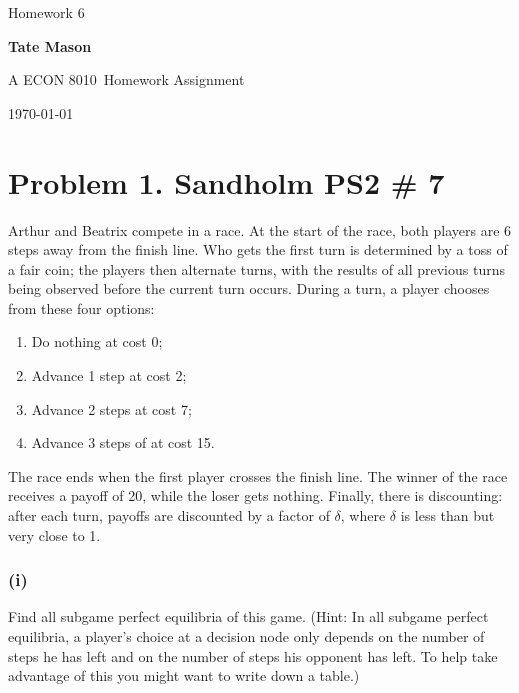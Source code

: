 \documentclass[10pt, a4paper]{article}
\newcommand\course{ECON 8010}                            %
\newcommand\hwnumber{6}                                  %
\newcommand\Information{Tate Mason}                        %
\begin{document}
  \begin{titlepage}
    \begin{center}
      \vspace*{3cm}
            
        \vspace{1cm}
        \huge
        Homework \hwnumber
            
        \vspace{1.5cm}
        \Large
            
        \textbf{\Information}                      %
            
        \vfill
        
        A \course \ Homework Assignment
            
        \vspace{1cm}
        \Large

        
        \today
            
    \end{center}
  \end{titlepage}

  \newpage
\section*{Problem 1. Sandholm PS2 \# 7}
  Arthur and Beatrix compete in a race. At the start of the race, both players are 6 steps away from the finish line. Who gets the first turn is determined by a toss of a fair coin; the players then alternate turns, with the results of all previous turns being observed before the current turn occurs.
  During a turn, a player chooses from these four options:
  \begin{enumerate}
    \item Do nothing at cost 0;
    \item Advance 1 step at cost 2;
    \item Advance 2 steps at cost 7;
    \item Advance 3 steps of at cost 15.
  \end{enumerate}
  The race ends when the first player crosses the finish line. The winner of the race receives a payoff of 20, while the loser gets nothing. Finally, there is discounting: after each turn, payoffs are discounted by a factor of $\delta$, where $\delta$ is less than but very close to 1.
  \subsubsection*{(i)}
  Find all subgame perfect equilibria of this game. (Hint: In all subgame perfect equilibria, a player's choice at a decision node only depends on the number of steps he has left and on the number of steps his opponent has left. To help take advantage of this you might want to write down a table.)
\end{document}
